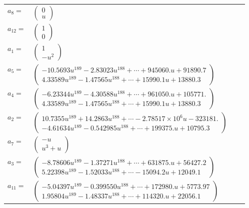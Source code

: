 \documentclass[1p]{elsarticle_modified}
\theoremstyle{definition}
\begin{document}
\begin{tabular}{m{7pt} m{180pt} m{7pt} m{180pt} }
\flushright $a_{8}=$&$\begin{pmatrix}0\\u\end{pmatrix}$ \\
\flushright $a_{12}=$&$\begin{pmatrix}1\\0\end{pmatrix}$ \\
\flushright $a_{1}=$&$\begin{pmatrix}1\\- u^2\end{pmatrix}$ \\
\flushright $a_{5}=$&$\begin{pmatrix}-10.5693 u^{189}-2.83023 u^{188}+\cdots+945060. u+91890.7\\4.33589 u^{189}-1.47565 u^{188}+\cdots+15990.1 u+13880.3\end{pmatrix}$ \\
\flushright $a_{4}=$&$\begin{pmatrix}-6.23344 u^{189}-4.30588 u^{188}+\cdots+961050. u+105771.\\4.33589 u^{189}-1.47565 u^{188}+\cdots+15990.1 u+13880.3\end{pmatrix}$ \\
\flushright $a_{2}=$&$\begin{pmatrix}10.7355 u^{189}+14.2863 u^{188}+\cdots-2.78517\times10^{6} u-323181.\\-4.61634 u^{189}-0.542985 u^{188}+\cdots+199375. u+10795.3\end{pmatrix}$ \\
\flushright $a_{7}=$&$\begin{pmatrix}- u\\u^3+u\end{pmatrix}$ \\
\flushright $a_{3}=$&$\begin{pmatrix}-8.78606 u^{189}-1.37271 u^{188}+\cdots+631875. u+56427.2\\5.22398 u^{189}-1.52033 u^{188}+\cdots-15094.2 u+12049.1\end{pmatrix}$ \\
\flushright $a_{11}=$&$\begin{pmatrix}-5.04397 u^{189}-0.399550 u^{188}+\cdots+172980. u+5773.97\\1.95804 u^{189}-1.48337 u^{188}+\cdots+114320. u+22056.1\end{pmatrix}$ \\

\end{tabular}
\end{document}
